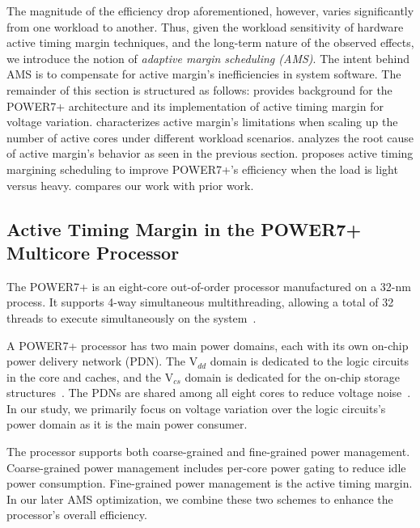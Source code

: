 The magnitude of the efficiency drop aforementioned, however, varies significantly from one workload to another. Thus, given the workload sensitivity of hardware active timing margin techniques, and the long-term nature of the observed effects, we introduce the notion of \emph{adaptive margin scheduling (AMS)}. The intent behind AMS is to compensate for active margin's inefficiencies in system software. The remainder of this section is structured as follows:  provides background for the POWER7+ architecture and its implementation of active timing margin for voltage variation.  characterizes active margin's limitations when scaling up the number of active cores under different workload scenarios.  analyzes the root cause of active margin's behavior as seen in the previous section.  proposes active timing margining scheduling to improve POWER7+'s efficiency when the load is light versus heavy.  compares our work with prior work.

\subsection{Active Timing Margin in the POWER7+ Multicore Processor}
\label{sec:ams:background}
The POWER7+ is an eight-core out-of-order processor manufactured on a 32-nm process. It supports 4-way simultaneous multithreading, allowing a total of 32 threads to execute simultaneously on the system~\cite{manousopoulos2012characterizing}.

A POWER7+ processor has two main power domains, each with its own on-chip power delivery network (PDN). The V$_{dd}$ domain is dedicated to the logic circuits in the core and caches, and the V$_{cs}$ domain is dedicated for the on-chip storage structures~\cite{zyuban2013ibm,barth201045nm}. The PDNs are shared among all eight cores to reduce voltage noise~\cite{james2007comparison}. In our study, we primarily focus on voltage variation over the logic circuits's power domain as it is the main power consumer.

The processor supports both coarse-grained and fine-grained power management. Coarse-grained power management includes per-core power gating to reduce idle power consumption. Fine-grained power management is the active timing margin. In our later AMS optimization, we combine these two schemes to enhance the processor's overall efficiency.

